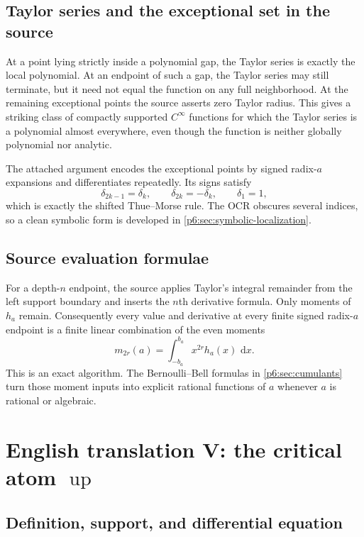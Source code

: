 \documentclass[11pt,oneside]{article}
\numberwithin{equation}{section}
\theoremstyle{definition}
\theoremstyle{remark}
\newcommand{\Up}{\operatorname{up}}
\newcommand{\dd}{\,\mathrm d}
\begin{document}
\subsection{Taylor series and the exceptional set in the source}

At a point lying strictly inside a polynomial gap, the Taylor series is exactly
the local polynomial.  At an endpoint of such a gap, the Taylor series may still
terminate, but it need not equal the function on any full neighborhood.  At the
remaining exceptional points the source asserts zero Taylor radius.  This gives
a striking class of compactly supported $C^\infty$ functions for which the
Taylor series is a polynomial almost everywhere, even though the function is
neither globally polynomial nor analytic.

The attached argument encodes the exceptional points by signed radix-$a$
expansions and differentiates repeatedly.  Its signs satisfy
\[
 \delta_{2k-1}=\delta_k,\qquad
 \delta_{2k}=-\delta_k,\qquad \delta_1=1,
\]
which is exactly the shifted Thue--Morse rule.  The OCR obscures several indices,
so a clean symbolic form is developed in \cref{p6:sec:symbolic-localization}.

\subsection{Source evaluation formulae}

For a depth-$n$ endpoint, the source applies Taylor's integral remainder from the
left support boundary and inserts the $n$th derivative formula.  Only moments of
$h_a$ remain.  Consequently every value and derivative at every finite signed
radix-$a$ endpoint is a finite linear combination of the even moments
\[
 m_{2r}(a)=\int_{-b_a}^{b_a}x^{2r}h_a(x)\,\dd x.
\]
This is an exact algorithm.  The Bernoulli--Bell formulas in
\cref{p6:sec:cumulants} turn those moment inputs into explicit rational functions
of $a$ whenever $a$ is rational or algebraic.

\section{English translation V: the critical atom \texorpdfstring{$\Up$}{up}}

\subsection{Definition, support, and differential equation}
\end{document}
